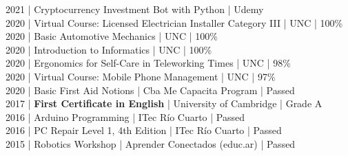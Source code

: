 {2021 | Cryptocurrency Investment Bot with Python | Udemy \\
2020 | Virtual Course: Licensed Electrician Installer Category III | UNC | 100\% \\
2020 | Basic Automotive Mechanics | UNC | 100\% \\
2020 | Introduction to Informatics | UNC | 100\% \\
2020 | Ergonomics for Self-Care in Teleworking Times | UNC | 98\% \\
2020 | Virtual Course: Mobile Phone Management | UNC | 97\% \\
2020 | Basic First Aid Notions | Cba Me Capacita Program | Passed \\
2017 | \textbf{First Certificate in English} | University of Cambridge | Grade A \\
2016 | Arduino Programming | ITec Río Cuarto | Passed \\
2016 | PC Repair Level 1, 4th Edition | ITec Río Cuarto | Passed \\
2015 | Robotics Workshop | Aprender Conectados (educ.ar) | Passed \\
}

\vspace{\spacesection}